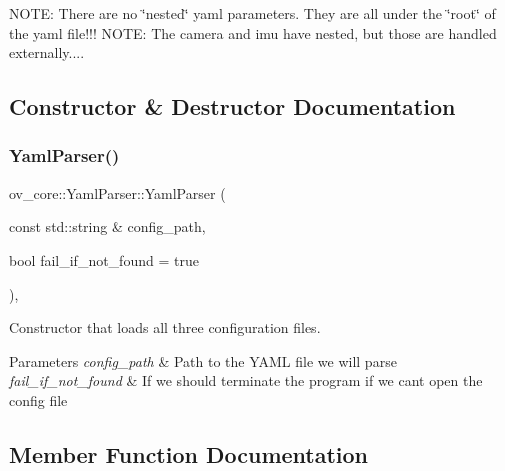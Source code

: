 N\+O\+TE\+: There are no \char`\"{}nested\char`\"{} yaml parameters. They are all under the \char`\"{}root\char`\"{} of the yaml file!!! N\+O\+TE\+: The camera and imu have nested, but those are handled externally.... 

\subsection{Constructor \& Destructor Documentation}
\mbox{\label{classov__core_1_1YamlParser_a4f4acc860b546d60f422a07d60eaa99b}} 
\subsubsection{\texorpdfstring{Yaml\+Parser()}{YamlParser()}}
{\footnotesize\ttfamily ov\+\_\+core\+::\+Yaml\+Parser\+::\+Yaml\+Parser (\begin{DoxyParamCaption}\item[{const std\+::string \&}]{config\+\_\+path,  }\item[{bool}]{fail\+\_\+if\+\_\+not\+\_\+found = {\ttfamily true} }\end{DoxyParamCaption})\hspace{0.3cm}{\ttfamily [inline]}, {\ttfamily [explicit]}}



Constructor that loads all three configuration files. 


\begin{DoxyParams}{Parameters}
{\em config\+\_\+path} & Path to the Y\+A\+ML file we will parse \\
\hline
{\em fail\+\_\+if\+\_\+not\+\_\+found} & If we should terminate the program if we can\textquotesingle{}t open the config file \\
\hline
\end{DoxyParams}


\subsection{Member Function Documentation}
\mbox{\label{classov__core_1_1YamlParser_a76a8ca471859dd6fd22e1772c3d1aa44}} 
